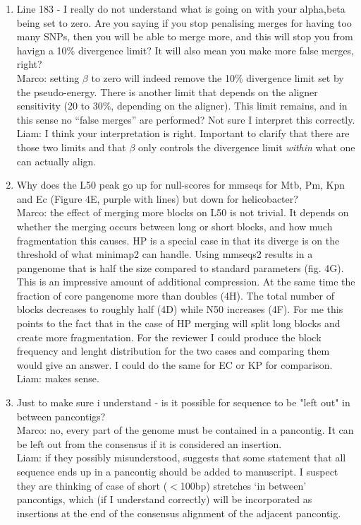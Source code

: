 \documentclass[aps,rmp,onecolumn]{revtex4-1}
\newcommand{\Marco}[1]{{\color{gray}Marco: #1}}
\newcommand{\Liam}[1]{{\color{teal}Liam: #1}}
\begin{document}
\begin{enumerate}
      \item Line 183 - I really do not understand what is going on with your alpha,beta being set to zero. Are you saying if you stop penalising merges for having too many SNPs, then you will be able to merge more, and this will stop you from havign a 10\% divergence limit? It will also mean you make more false merges, right?\\
            \Marco{setting $\beta$ to zero will indeed remove the 10\% divergence limit set by the pseudo-energy. There is another limit that depends on the aligner sensitivity (20 to 30\%, depending on the aligner). This limit remains, and in this sense no ``false merges'' are performed? Not sure I interpret this correctly.}\\
            \Liam{I think your interpretation is right. Important to clarify that there are those two limits and that $\beta$ only controls the divergence limit \textit{within} what one can actually align.}

      \item Why does the L50 peak go up for null-scores for mmseqs for Mtb, Pm, Kpn and Ec (Figure 4E, purple with lines) but down for helicobacter?\\
            \Marco{the effect of merging more blocks on L50 is not trivial. It depends on whether the merging occurs between long or short blocks, and how much fragmentation this causes. HP is a special case in that its diverge is on the threshold of what minimap2 can handle. Using mmseqs2 results in a pangenome that is half the size compared to standard parameters (fig. 4G). This is an impressive amount of additional compression. At the same time the fraction of core pangenome more than doubles (4H). The total number of blocks decreases to roughly half (4D) while N50 increases (4F). For me this points to the fact that in the case of HP merging will split long blocks and create more fragmentation. For the reviewer I could produce the block frequency and lenght distribution for the two cases and comparing them would give an answer. I could do the same for EC or KP for comparison.}\\
            \Liam{makes sense.}

      \item Just to make sure i understand - is it possible for sequence to be "left out" in between pancontigs?\\
            \Marco{no, every part of the genome must be contained in a pancontig. It can be left out from the consensus if it is considered an insertion.}\\
            \Liam{if they possibly misunderstood, suggests that some statement that all sequence ends up in a pancontig should be added to manuscript. I suspect they are thinking of case of short ($<$100bp) stretches `in between' pancontigs, which (if I understand correctly) will be incorporated as insertions at the end of the consensus alignment of the adjacent pancontig.}


\end{enumerate}
\end{document}
